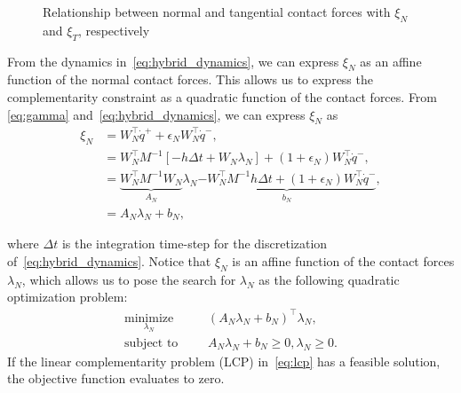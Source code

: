 %
\begin{figure}[tb]
  \centering
  \caption{Relationship between normal and tangential contact forces with $\xi_N$ and $\xi_T$, respectively}
  \label{fig:unilateral_primitive}
\end{figure}
%

From the dynamics in~\eqref{eq:hybrid_dynamics}, we can express $\xi_N$ as an
affine function of the normal contact forces. 
%
This allows us to express the complementarity constraint as a quadratic function
of the contact forces.
%
From \eqref{eq:gamma} and~\eqref{eq:hybrid_dynamics}, we can express $\xi_N$
as 
\begin{equation}
  \begin{aligned}
    \xi_N &= W_N^\top \dot{q}^+ + \epsilon_N W_N^\top \dot{q}^-, \\
    &= W_N^\top M^{-1}[-h \Delta t + W_N \lambda_N] + (1 + \epsilon_N)W_N^\top \dot{q}^-, \\
    &= \underbrace{W_N^\top M^{-1}W_N}_{A_N} \lambda_N \underbrace{-W_N^\top M^{-1}h \Delta t + (1 + \epsilon_N) W_N^\top \dot{q}^-}_{b_N}, \\
    &= A_N \lambda_N + b_N,
  \end{aligned}
  \label{eq:Ab}
\end{equation}

\noindent where $\Delta t$ is the integration time-step for the discretization
of~\eqref{eq:hybrid_dynamics}.
%
Notice that $\xi_N$ is an affine function of the contact forces $\lambda_N$,
which allows us to pose the search for $\lambda_N$ as the following quadratic
optimization problem:
\begin{equation}
  \begin{aligned}
      \underset{\lambda_N}{\textrm{minimize}} 
      & & &(A_N \lambda_N + b_N)^\top \lambda_N, \\%
      \textrm{subject to}
      & & &A_N \lambda_N + b_N \geq 0, \lambda_N \geq 0.
  \end{aligned}
  \label{eq:lcp}
\end{equation}
\noindent If the linear complementarity problem (LCP) in~\eqref{eq:lcp} has a
feasible solution, the objective function evaluates to zero.
%

